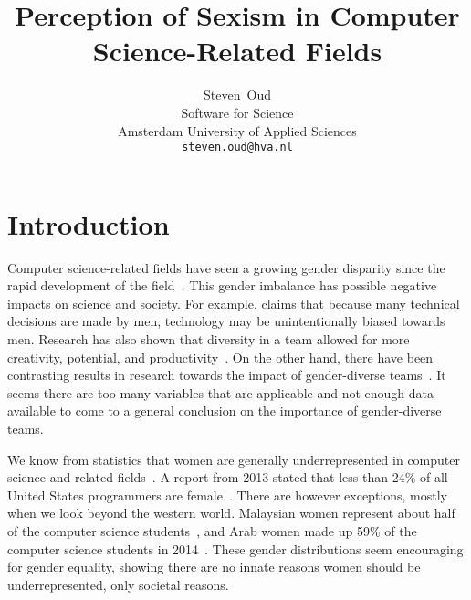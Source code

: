 \documentclass[twocolumn, switch]{article}
\title{Perception of Sexism in Computer Science-Related Fields}
\author{
  Steven~Oud \\
  Software for Science \\
  Amsterdam University of Applied Sciences\\
  \texttt{steven.oud@hva.nl} \\
}
\begin{document}
    
    \twocolumn[
    \begin{@twocolumnfalse}
        
        \maketitle
        
        
    \end{@twocolumnfalse}
    ]

    \section{Introduction}
    Computer science-related fields have seen a growing gender disparity since the rapid development of the field~\cite{camp2001women, chan2000gender}.
    This gender imbalance has possible negative impacts on science and society.
    For example, \textcite{williams2014you} claims that because many technical decisions are made by men, technology may be unintentionally biased towards men.
    Research has also shown that diversity in a team allowed for more creativity, potential, and productivity~\cite{dubow2013diversity}.
    On the other hand, there have been contrasting results in research towards the impact of gender-diverse teams~\cite{svyantek2004received}.
    It seems there are too many variables that are applicable and not enough data available to come to a general conclusion on the importance of gender-diverse teams.
    
    We know from statistics that women are generally underrepresented in computer science and related fields~\cite{salminen1999bringing}.
    A report from 2013 stated that less than 24\% of all United States programmers are female~\cite{sydell2013blazing}.
    There are however exceptions, mostly when we look beyond the western world.
    Malaysian women represent about half of the computer science students~\cite{lagesen2008cyberfeminist}, and Arab women made up 59\% of the computer science students in 2014~\cite{Alghamdi971716}.
    These gender distributions seem encouraging for gender equality, showing there are no innate reasons women should be underrepresented, only societal reasons.
    
\end{document}
